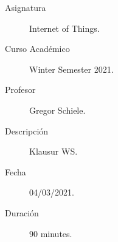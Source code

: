 \documentclass[12pt]{article}
\begin{document}

    
    

    \begin{description}
        \item[Asignatura] Internet of Things.
        \item[Curso Académico] Winter Semester 2021.
        \item[Profesor] Gregor Schiele.
        \item[Descripción] Klausur WS.
        \item[Fecha] 04/03/2021.
        \item[Duración] 90 minutes.
    
    \end{description}
    \newpage


    
\end{document}
